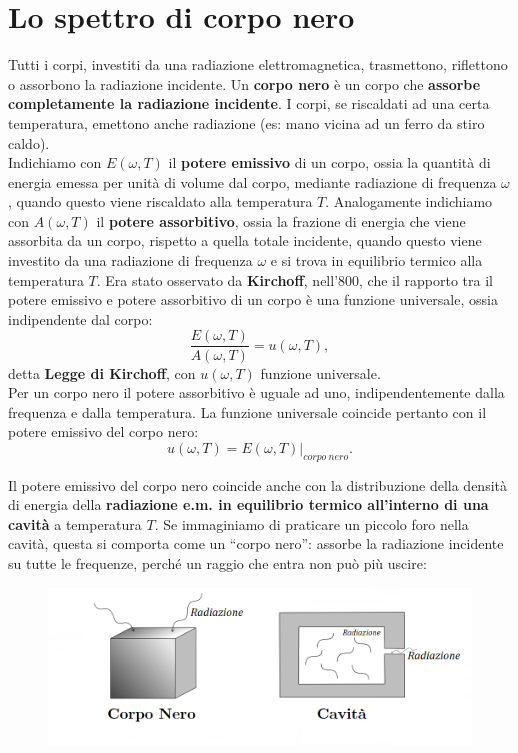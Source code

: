 \section{Lo spettro di corpo nero}
Tutti i corpi, investiti da una radiazione elettromagnetica, trasmettono, riflettono o assorbono la radiazione incidente. Un \textbf{corpo nero} è un corpo che \textbf{assorbe completamente la radiazione incidente}. I corpi, se riscaldati ad una certa temperatura, emettono anche radiazione (es: mano vicina ad un ferro da stiro caldo).\\

Indichiamo con $E(\omega , T) $ il \textbf{potere emissivo} di un corpo, ossia la quantità di energia emessa per unità di volume dal corpo, mediante radiazione di frequenza $\omega$, quando questo viene riscaldato alla temperatura $T$. Analogamente indichiamo con $A(\omega , T )$ il \textbf{potere assorbitivo}, ossia la frazione di energia che viene assorbita da un corpo, rispetto a quella totale incidente, quando questo viene investito da una radiazione di frequenza $\omega$ e si trova in equilibrio termico alla temperatura  $T$.
Era stato osservato da \textbf{Kirchoff}, nell'800, che il rapporto tra il potere emissivo e potere assorbitivo di un corpo è una funzione universale, ossia indipendente dal corpo:
	\begin{equation}
		\boxed{
			\frac{E(\omega ,T)}{A(\omega ,T)}= u(\omega , T),
		}
	\end{equation}
detta \textbf{Legge di Kirchoff}, con $u(\omega , T)$ funzione universale.\\
Per un corpo nero il potere assorbitivo è uguale ad uno, indipendentemente dalla frequenza e dalla temperatura. La funzione universale coincide pertanto con il potere emissivo del corpo nero:
	\begin{equation}
		u(\omega, T)= E(\omega , T)|_{corpo\ nero}.
	\end{equation}
	
Il potere emissivo del corpo nero coincide anche con la distribuzione della densità di energia della \textbf{radiazione e.m. in equilibrio termico all'interno di una cavità} a temperatura $T$. Se immaginiamo di praticare un piccolo foro nella cavità, questa si comporta come un ``corpo nero'': assorbe la radiazione incidente su tutte le frequenze, perché un raggio che entra non può più uscire:\\
	\begin{figure}[!htbp]
		\includegraphics[width=\textwidth]{immagini/cap_1/fig_1_1.png}
	\end{figure}
	
